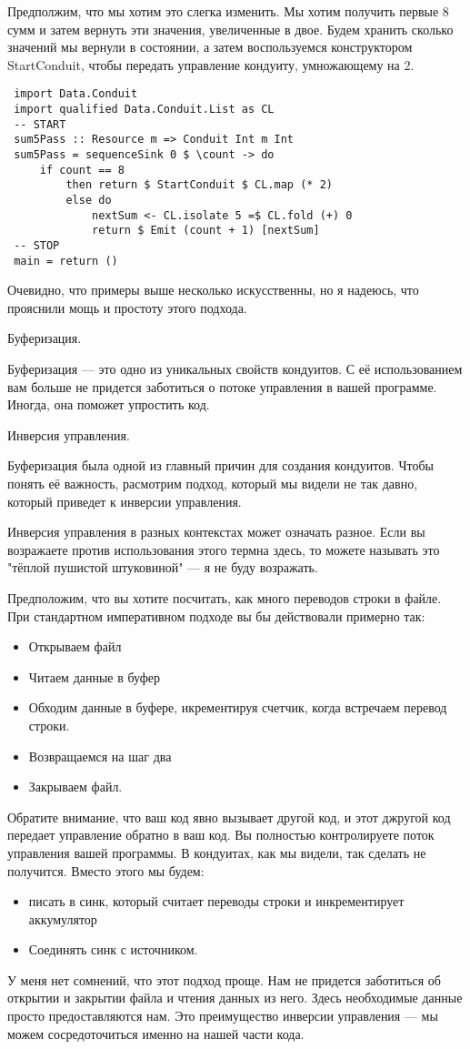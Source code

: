 Предполжим, что мы хотим это слегка изменить. Мы хотим получить первые 8 сумм и затем вернуть эти значения, увеличенные в двое. Будем хранить сколько значений мы вернули в состоянии, а затем воспользуемся конструктором StartConduit, чтобы передать управление кондуиту, умножающему на 2.
\begin{lstlisting}
 import Data.Conduit
 import qualified Data.Conduit.List as CL
 -- START
 sum5Pass :: Resource m => Conduit Int m Int
 sum5Pass = sequenceSink 0 $ \count -> do
     if count == 8
         then return $ StartConduit $ CL.map (* 2)
         else do
             nextSum <- CL.isolate 5 =$ CL.fold (+) 0
             return $ Emit (count + 1) [nextSum]
 -- STOP
 main = return ()
\end{lstlisting}
Очевидно, что примеры выше несколько искусственны, но я надеюсь, что прояснили мощь и простоту этого подхода. 
 
Буферизация.

Буферизация --- это одно из уникальных свойств кондуитов. С её использованием вам больше не придется заботиться о потоке управления в вашей программе.
Иногда, она поможет упростить код.


Инверсия управления.

Буферизация была одной из главный причин для создания кондуитов. Чтобы понять её важность, расмотрим подход, который мы видели не так давно, который приведет к инверсии управления.

Инверсия управления в разных контекстах может означать разное. Если вы возражаете против использования этого термна здесь, то можете называть это "тёплой пушистой штуковиной" --- я не буду возражать.

Предположим, что вы хотите посчитать, как много переводов строки в файле. При стандартном императивном подходе вы бы действовали примерно так:

\begin{itemize}  
\item   Открываем файл
\item   Читаем данные в буфер
\item   Обходим данные в буфере, икрементируя счетчик, когда встречаем перевод строки.
\item   Возвращаемся на шаг два
\item   Закрываем файл.
\end{itemize}
Обратите внимание, что ваш код явно вызывает другой код, и этот джругой код передает управление обратно в ваш код. Вы полностью контролируете поток управления вашей программы. В кондуитах, как мы видели, так сделать не получится. Вместо этого мы будем:
\begin{itemize}
\item  писать в синк, который считает переводы строки и инкрементирует аккумулятор
\item  Соединять синк с источником.
\end{itemize} 
У меня нет сомнений, что этот подход проще. Нам не придется заботиться об открытии и закрытии файла и чтения данных из него. Здесь необходимые данные просто предоставляются нам. Это преимущество инверсии управления --- мы можем сосредоточиться именно на нашей части кода.

